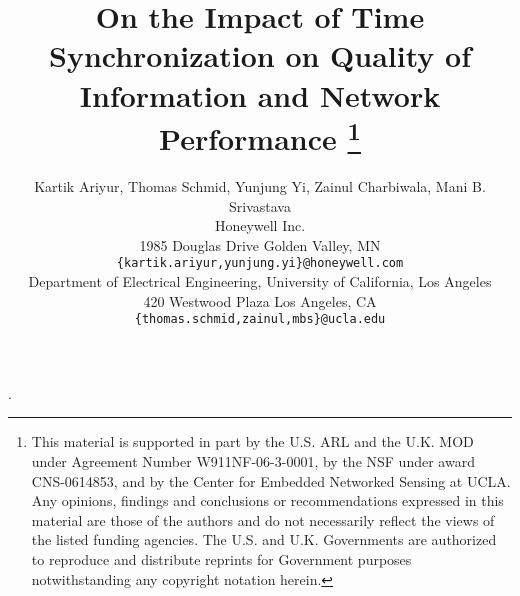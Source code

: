 \documentclass[conference]{IEEEtran}
\begin{document}
\title{On the Impact of Time Synchronization on Quality of Information and Network Performance
\thanks{This material is supported in part by the U.S. ARL and the
U.K. MOD under Agreement Number W911NF-06-3-0001, by the NSF under
award CNS-0614853, and by the Center for Embedded Networked Sensing
at UCLA. Any opinions, findings and conclusions or recommendations
expressed in this material are those of the authors and do not
necessarily reflect the views of the listed funding agencies. The
U.S. and U.K. Governments are authorized to reproduce and distribute
reprints for Government purposes notwithstanding any copyright
notation herein.}}
\author{{\sc Kartik Ariyur\dag}, {\sc Thomas Schmid\ddag}, {\sc Yunjung Yi\dag}, {\sc Zainul Charbiwala\ddag}, {\sc Mani B. Srivastava\ddag}\\
\normalsize{\dag Honeywell Inc.} \\
\normalsize{1985 Douglas Drive Golden Valley, MN}\\
\normalsize{\tt\{kartik.ariyur,yunjung.yi\}@honeywell.com}\\
\normalsize{\ddag Department of Electrical Engineering, }
\normalsize{University of California, Los Angeles} \\
\normalsize{420 Westwood Plaza Los Angeles, CA}\\
\normalsize{\tt\{thomas.schmid,zainul,mbs\}@ucla.edu} }

\maketitle
\newtheorem{theorem}{Theorem}
\newtheorem{assumption}{Assumption}
.\normalbaselineskip


%
%
%


%
%





\end{document}
